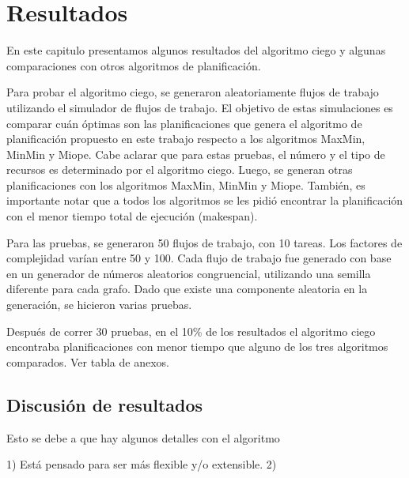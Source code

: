 \chapter{Resultados}

En este capitulo presentamos algunos resultados del algoritmo ciego y algunas comparaciones con otros algoritmos de planificación. 

Para probar el algoritmo ciego, se generaron aleatoriamente flujos de trabajo utilizando el simulador de flujos de trabajo. El objetivo de estas simulaciones es comparar cuán óptimas son las planificaciones que genera el algoritmo de planificación propuesto en este trabajo respecto a los algoritmos MaxMin, MinMin y Miope. Cabe aclarar que para estas pruebas, el número y el tipo de recursos es determinado por el algoritmo ciego. Luego, se generan otras planificaciones con los algoritmos MaxMin, MinMin y Miope. También, es importante notar que a todos los algoritmos se les pidió encontrar la planificación con el menor tiempo total de ejecución (makespan).


Para las pruebas, se generaron 50 flujos de trabajo, con 10 tareas. Los factores de complejidad varían entre 50 y 100. Cada flujo de trabajo fue generado con base en un generador de números aleatorios congruencial, utilizando una semilla diferente para cada grafo. Dado que existe una componente aleatoria en la generación, se hicieron varias pruebas.

Después de correr 30 pruebas, en el 10\% de los resultados el algoritmo ciego encontraba planificaciones con menor tiempo que alguno de los tres algoritmos comparados. Ver tabla de anexos.

\section{Discusión de resultados}

Esto se debe a que hay algunos detalles con el algoritmo

1) Está pensado para ser más flexible y/o extensible.
2)
